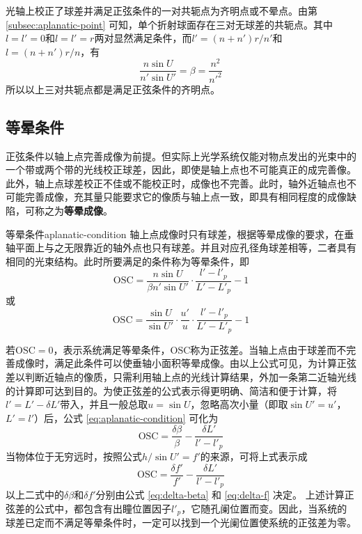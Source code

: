 \documentclass[cn,10pt,chinesefont=founder,math=mtpro2,cite=super,toc=onecol,twoside,openany]{elegantbook}
\begin{document}
光轴上校正了球差并满足正弦条件的一对共轭点为齐明点或不晕点。由第 \ref{subsec:aplanatic-point} 可知，单个折射球面存在三对无球差的共轭点。其中$l=l'=0$和$l=l'=r$两对显然满足条件，而$l'=(n+n')r/n'$和$l=(n+n')r/n$，有
\begin{equation}
\frac{n\sin U}{n'\sin U'}=\beta=\frac{n^2}{n'^2}
\end{equation}
所以以上三对共轭点都是满足正弦条件的齐明点。

\subsection{等晕条件}
正弦条件以轴上点完善成像为前提。但实际上光学系统仅能对物点发出的光束中的一个带或两个带的光线校正球差，因此，即使是轴上点也不可能真正的成完善像。此外，轴上点球差校正不佳或不能校正时，成像也不完善。此时，轴外近轴点也不可能完善成像，充其量只能要求它的像质与轴上点一致，即具有相同程度的成像缺陷，可称之为\textbf{等晕成像}。

\begin{definition}{等晕条件}{aplanatic-condition}
	轴上点成像时只有球差，根据等晕成像的要求，在垂轴平面上与之无限靠近的轴外点也只有球差。并且对应孔径角球差相等，二者具有相同的光束结构。此时所要满足的条件称为等晕条件，即
	\begin{equation}
	\mathrm{OSC}=\frac{n\sin U}{\beta n'\sin U'}\cdot\frac{l'-l'_p}{L'-L'_p}-1
	\end{equation}
	或
	\begin{equation}
	\mathrm{OSC}=\frac{\sin U}{\sin U'}\cdot\frac{u'}{u}\cdot\frac{l'-l'_p}{L'-L'_p}-1
	\label{eq:aplanatic-condition}
	\end{equation}
\end{definition}
若$\mathrm{OSC}=0$，表示系统满足等晕条件，$\mathrm{OSC}$称为正弦差。当轴上点由于球差而不完善成像时，满足此条件可以使垂轴小面积等晕成像。由以上公式可见，为计算正弦差以判断近轴点的像质，只需利用轴上点的光线计算结果，外加一条第二近轴光线的计算即可达到目的。为使正弦差的公式表示得更明确、简洁和便于计算，将$l'=L'-\delta L'$带入，并且一般总取$u=\sin U$，忽略高次小量（即取$\sin U'=u'$，$L'=l'$）后，公式 \eqref{eq:aplanatic-condition} 可化为
\begin{equation}
\mathrm{OSC}=\frac{\delta\beta}{\beta}-\frac{\delta L'}{l'-l'_p}
\end{equation}
当物体位于无穷远时，按照公式$h/\sin U'=f'$的来源，可将上式表示成
\begin{equation}
\mathrm{OSC}=\frac{\delta f'}{f'}-\frac{\delta L'}{l'-l'_p}
\end{equation}
以上二式中的$\delta\beta$和$\delta f'$分别由公式 \eqref{eq:delta-beta} 和 \eqref{eq:delta-f} 决定。
上述计算正弦差的公式中，都包含有出瞳位置因子$l'_p$，它随孔阑位置而变。因此，当系统的球差已定而不满足等晕条件时，一定可以找到一个光阑位置使系统的正弦差为零。
\end{document}
